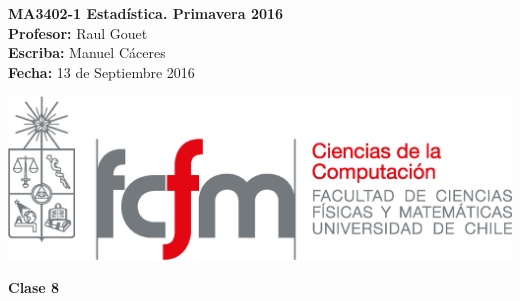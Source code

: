 \documentclass[10pt]{article}
\theoremstyle{plain}
\theoremstyle{definition}
\newcommand{\catnum}{8} %
\newcommand{\fecha}{13 de Septiembre 2016 }
\begin{document}
\vspace*{-1.2 cm}
\begin{minipage}{0.6\textwidth}
\begin{flushleft}
\hspace*{-0.5cm}\textbf{MA3402-1 Estadística. Primavera 2016}\\
\hspace*{-0.5cm}\textbf{Profesor:} Raul Gouet\\
\hspace*{-0.5cm}\textbf{Escriba:} Manuel Cáceres\\
\hspace*{-0.5cm}\textbf{Fecha:} \fecha
\end{flushleft}
\end{minipage}
\begin{minipage}{0.36\textwidth}
\begin{flushright}
\includegraphics[scale=0.3]{imagenes/fcfm_dcc}
\end{flushright}
\end{minipage}
\bigskip

\begin{center}
\LARGE\textbf{Clase \catnum}
\end{center}
\end{document}
